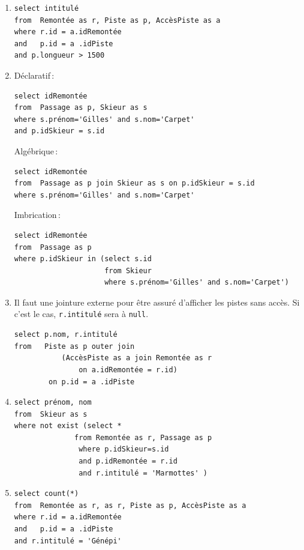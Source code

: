 \begin{solution}

\begin{enumerate}

\item 
\begin{verbatim}
select intitulé 
from  Remontée as r, Piste as p, AccèsPiste as a 
where r.id = a.idRemontée 
and   p.id = a .idPiste 
and p.longueur > 1500
\end{verbatim}


\item Déclaratif\,:

\begin{verbatim}
select idRemontée 
from  Passage as p, Skieur as s
where s.prénom='Gilles' and s.nom='Carpet'
and p.idSkieur = s.id
\end{verbatim}

Algébrique\,:

\begin{verbatim}
select idRemontée 
from  Passage as p join Skieur as s on p.idSkieur = s.id
where s.prénom='Gilles' and s.nom='Carpet'
\end{verbatim}


Imbrication\,:

\begin{verbatim}
select idRemontée 
from  Passage as p 
where p.idSkieur in (select s.id
                     from Skieur
                     where s.prénom='Gilles' and s.nom='Carpet')
\end{verbatim}

\item  Il faut une jointure externe pour être assuré d'afficher les pistes sans accès.
   Si c'est le cas, \texttt{r.intitulé} sera à \texttt{null}.
\begin{verbatim}
select p.nom, r.intitulé
from   Piste as p outer join 
           (AccèsPiste as a join Remontée as r 
               on a.idRemontée = r.id) 
        on p.id = a .idPiste 
\end{verbatim}


\item 
\begin{verbatim}
select prénom, nom
from  Skieur as s
where not exist (select *
              from Remontée as r, Passage as p
               where p.idSkieur=s.id
               and p.idRemontée = r.id
               and r.intitulé = 'Marmottes' )
\end{verbatim}


\item 
\begin{verbatim}
select count(*)
from  Remontée as r, as r, Piste as p, AccèsPiste as a 
where r.id = a.idRemontée 
and   p.id = a .idPiste 
and r.intitulé = 'Génépi'
\end{verbatim}



\end{enumerate}

\end{solution}



